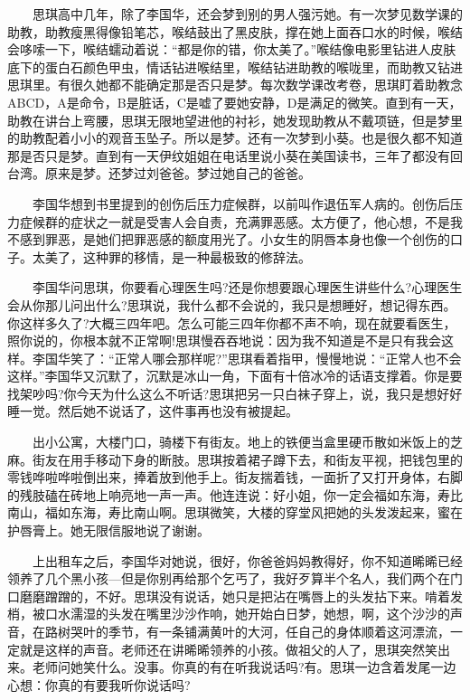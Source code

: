 \documentclass[12pt,UTF8]{ctexbook}
\begin{document}
　　思琪高中几年，除了李国华，还会梦到别的男人强污她。有一次梦见数学课的助教，助教瘦黑得像铅笔芯，喉结鼓出了黑皮肤，撑在她上面吞口水的时候，喉结会哆嗦一下，喉结蠕动着说：\enquote{都是你的错，你太美了。}喉结像电影里钻进人皮肤底下的蛋白石颜色甲虫，情话钻进喉结里，喉结钻进助教的喉咙里，而助教又钻进思琪里。有很久她都不能确定那是否只是梦。每次数学课改考卷，思琪盯着助教念ABCD，A是命令，B是脏话，C是嘘了要她安静，D是满足的微笑。直到有一天，助教在讲台上弯腰，思琪无限地望进他的衬衫，她发现助教从不戴项链，但是梦里的助教配着小小的观音玉坠子。所以是梦。还有一次梦到小葵。也是很久都不知道那是否只是梦。直到有一天伊纹姐姐在电话里说小葵在美国读书，三年了都没有回台湾。原来是梦。还梦过刘爸爸。梦过她自己的爸爸。

　　李国华想到书里提到的创伤后压力症候群，以前叫作退伍军人病的。创伤后压力症候群的症状之一就是受害人会自责，充满罪恶感。太方便了，他心想，不是我不感到罪恶，是她们把罪恶感的额度用光了。小女生的阴唇本身也像一个创伤的口子。太美了，这种罪的移情，是一种最极致的修辞法。

　　李国华问思琪，你要看心理医生吗?还是你想要跟心理医生讲些什么?心理医生会从你那儿问出什么?思琪说，我什么都不会说的，我只是想睡好，想记得东西。你这样多久了?大概三四年吧。怎么可能三四年你都不声不响，现在就要看医生，照你说的，你根本就不正常啊!思琪慢吞吞地说：因为我不知道是不是只有我会这样。李国华笑了：\enquote{正常人哪会那样呢?}思琪看着指甲，慢慢地说：\enquote{正常人也不会这样。}李国华又沉默了，沉默是冰山一角，下面有十倍冰冷的话语支撑着。你是要找架吵吗?你今天为什么这么不听话?思琪把另一只白袜子穿上，说，我只是想好好睡一觉。然后她不说话了，这件事再也没有被提起。

　　出小公寓，大楼门口，骑楼下有街友。地上的铁便当盒里硬币散如米饭上的芝麻。街友在用手移动下身的断肢。思琪按着裙子蹲下去，和街友平视，把钱包里的零钱哗啦哗啦倒出来，捧着放到他手上。街友揣着钱，一面折了又打开身体，右脚的残肢磕在砖地上响亮地一声一声。他连连说：好小姐，你一定会福如东海，寿比南山，福如东海，寿比南山啊。思琪微笑，大楼的穿堂风把她的头发泼起来，蜜在护唇膏上。她无限信服地说了谢谢。

　　上出租车之后，李国华对她说，很好，你爸爸妈妈教得好，你不知道晞晞已经领养了几个黑小孩---但是你别再给那个乞丐了，我好歹算半个名人，我们两个在门口磨磨蹭蹭的，不好。思琪没有说话，她只是把沾在嘴唇上的头发拈下来。啃着发梢，被口水濡湿的头发在嘴里沙沙作响，她开始白日梦，她想，啊，这个沙沙的声音，在路树哭叶的季节，有一条铺满黄叶的大河，任自己的身体顺着这河漂流，一定就是这样的声音。老师还在讲晞晞领养的小孩。做祖父的人了，思琪突然笑出来。老师问她笑什么。没事。你真的有在听我说话吗?有。思琪一边含着发尾一边心想：你真的有要我听你说话吗?
\end{document}
